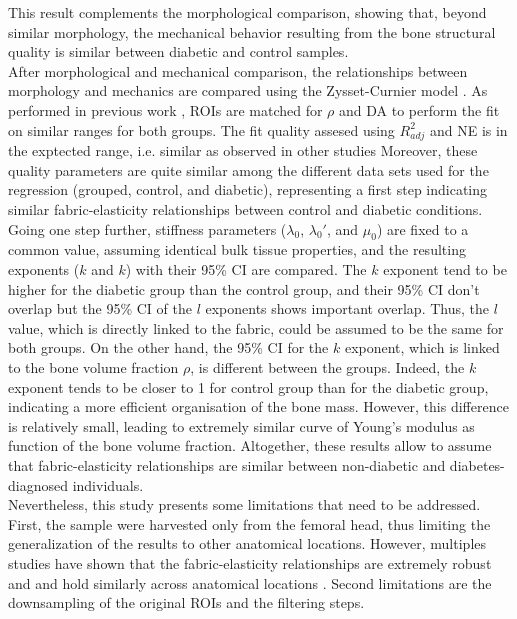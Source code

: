 \documentclass[a4paper,fleqn]{DC_ArtStyle}
\begin{document}
	This result complements the morphological comparison, showing that, beyond similar morphology, the mechanical behavior resulting from the bone structural quality is similar between diabetic and control samples.
	\\[0.5em]
	After morphological and mechanical comparison, the relationships between morphology and mechanics are compared using the Zysset-Curnier model \cite{Zysset1995}.
	As performed in previous work \cite{Simon2022}, ROIs are matched for $\rho$ and DA to perform the fit on similar ranges for both groups.
	The fit quality assesed using $R_{adj}^{2}$ and NE is in the exptected range, i.e. similar as observed in other studies \cite{Gross2012, Panyasantisuk2015, Simon2022}
	Moreover, these quality parameters are quite similar among the different data sets used for the regression (grouped, control, and diabetic), representing a first step indicating similar fabric-elasticity relationships between control and diabetic conditions.
	Going one step further, stiffness parameters ($\lambda_0$, $\lambda_0'$, and $\mu_0$) are fixed to a common value, assuming identical bulk tissue properties, and the resulting exponents ($k$ and $k$) with their 95\% CI are compared.
	The $k$ exponent tend to be higher for the diabetic group than the control group, and their 95\% CI don't overlap but the 95\% CI of the $l$ exponents shows important overlap.
	Thus, the $l$ value, which is directly linked to the fabric, could be assumed to be the same for both groups.
	On the other hand, the 95\% CI for the $k$ exponent, which is linked to the bone volume fraction $\rho$, is different between the groups.
	Indeed, the $k$ exponent tends to be closer to 1 for control group than for the diabetic group, indicating a more efficient organisation of the bone mass.
	However, this difference is relatively small, leading to extremely similar curve of Young's modulus as function of the bone volume fraction.
	Altogether, these results allow to assume that fabric-elasticity relationships are similar between non-diabetic and diabetes-diagnosed individuals.
	\\[0.5em]
	Nevertheless, this study presents some limitations that need to be addressed.
	First, the sample were harvested only from the femoral head, thus limiting the generalization of the results to other anatomical locations.
	However, multiples studies have shown that the fabric-elasticity relationships are extremely robust and and hold similarly across anatomical locations \cite{Gross2012,Panyasantisuk2015,Simon2022}.
	Second limitations are the downsampling of the original ROIs and the filtering steps.
\end{document}
